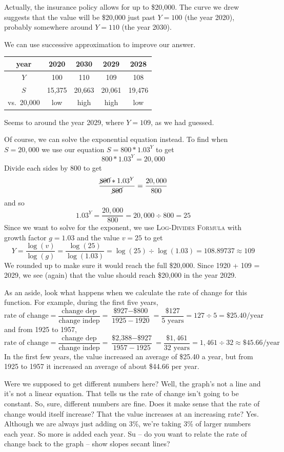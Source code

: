 Actually, the insurance policy allows for up to \$20,000. The curve we drew suggests that the value will be \$20,000 just past $Y=100$ (the year 2020), probably somewhere around $Y=110$ (the year 2030).  

We can use successive approximation to improve our answer. 
\begin{center}
\begin{tabular} {|c| |c  |c |c |c|}\hline
year & 2020 & 2030 & 2029 &  2028  \\ \hline
$Y$ & 100 & 110 & 109 & 108\\ \hline
$S$ & 15,375 & 20,663 & 20,061 & 19,476\\ \hline
vs.\ 20,000& low & high & high & low \\ \hline
\end{tabular}
\end{center}
Seems to around the year 2029, where $Y=109$, as we had guessed.

Of course, we can solve the exponential equation instead. To find when $S= 20,000$ we use our equation $S = 800 \ast 1.03^Y$ to get 
$$800 \ast 1.03^Y =  20,000 $$
Divide each sides by 800 to get
$$ \frac{\cancel{800} \ast 1.03^Y}{\cancel{800}} = \frac{ 20,000}{800} $$
and so $$1.03^Y = \frac{ 20,000}{800}  =  20,000 \div {800} = 25$$
Since we want to solve for the exponent, we use \textsc{Log-Divides Formula} with growth factor $g=1.03$ and the value $v= 25$ to get
$$Y =  \frac{\log (v)}{\log(g)} =  \frac{\log (25)}{\log(1.03)} = \log (25) \div \log (1.03) = 108.89737 \approx 109  $$
We rounded up to make sure it would reach the full \$20,000.  Since 1920 + 109 = 2029, we see (again) that the value should reach \$20,000 in the year 2029.

As an aside, look what happens when we calculate the rate of change for this function.  For example, during the first five years, 
$$\text{rate of change} =  \frac{\text{change dep}}{\text{change indep}} = \frac{\text{\$927} - \text{\$800}}{1925-1920}= \frac{\$127}{5 \text{ years}} = 127 \div 5 = \$25.40\text{/year}$$
and from 1925 to 1957, 
$$\text{rate of change} =  \frac{\text{change dep}}{\text{change indep}} = \frac{\text{\$2,388} - \text{\$927}}{1957-1925}= \frac{\$1,461}{32 \text{ years}} = 1,461 \div 32 \approx \$45.66\text{/year}$$
In the first few years, the value increased an average of \$25.40 a year, but from 1925 to 1957 it increased an average of about \$44.66 per year.

Were we supposed to get different numbers here?  Well, the graph's not a line and it's not a linear equation.  That tells us the rate of change isn't going to be constant.  So, sure, different numbers are fine.  Does it make sense that the rate of change would itself increase?  That the value increases at an increasing rate? Yes. Although we are always just adding on 3\%, we're taking 3\% of larger numbers each year.  So more is added each year.  Su -- do you want to relate the rate of change back to the graph -- show slopes secant lines?


%